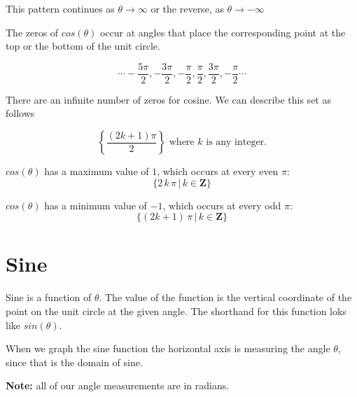 \documentclass{ximera}
\begin{document}
This pattern continues as $\theta \rightarrow \infty$ or the reverse, as $\theta \rightarrow -\infty$

The zeros of $cos(\theta)$ occur at angles that place the corresponding point at the top or the bottom of the unit circle.  


\[     \cdots -\frac{5\pi}{2},  -\frac{3\pi}{2},  -\frac{\pi}{2},  \frac{\pi}{2},  \frac{3\pi}{2},  -\frac{\pi}{2} \cdots \]


There are an infinite number of zeros for cosine.  We can describe this set as follows


\[  \left\{     \frac{(2k+1)\pi}{2}          \right\}    \text{ where }  k  \text{ is any integer.}     \]





$cos(\theta)$ has a maximum value of $1$, which occurs at every even $\pi$:  
\[ \{  2 \, k \, \pi \, | \, k \in \textbf{Z}\} \]



$cos(\theta)$ has a minimum value of $-1$, which occurs at every odd $\pi$:  
\[ \{  (2k+1) \, \pi \, | \, k \in \textbf{Z}\} \]











\section{Sine}

Sine is a function of $\theta$. The value of the function is the vertical coordinate of the point on the unit circle at the given angle. The shorthand for this function loks like $sin(\theta)$. 



When we graph the sine function the horizontal axis is measuring the angle $\theta$, since that is the domain of sine.

\textbf{Note:}  all of our angle measurements are in radians.
\end{document}
